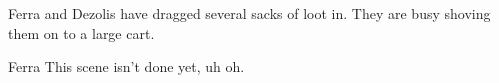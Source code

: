 

Ferra and Dezolis have dragged several sacks of loot in.
They are busy shoving them on to a large cart.

\begin{dialogue}{Ferra}
This scene isn't done yet, uh oh.
\end{dialogue}




